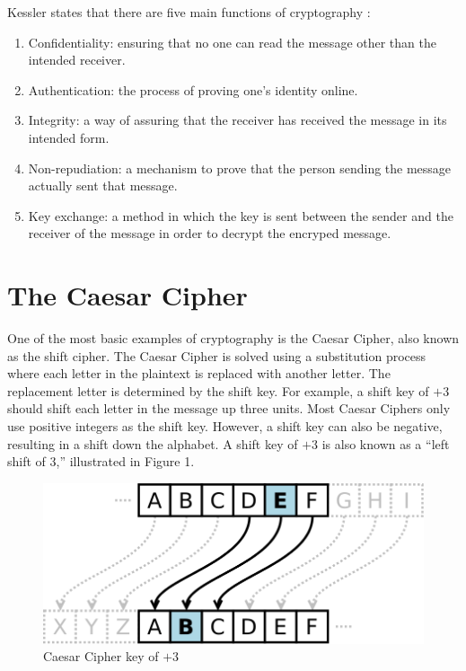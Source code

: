 \documentclass{article}
\begin{document}
Kessler states that there are five main functions of cryptography \cite{ref2:2}:
\begin{enumerate}
    \item Confidentiality: ensuring that no one can read the message other than the intended receiver.
    \item Authentication: the process of proving one’s identity online.
    \item Integrity: a way of assuring that the receiver has received the message in its intended form.
    \item Non-repudiation: a mechanism to prove that the person sending the message actually sent that message.
    \item Key exchange: a method in which the key is sent between the sender and the receiver of the message in order to decrypt the encryped message.
\end{enumerate}

\section{The Caesar Cipher}
One of the most basic examples of cryptography is the Caesar Cipher, also known as the shift cipher. The Caesar Cipher is solved using a substitution process where each letter in the plaintext is replaced with another letter. The replacement letter is determined by the shift key. For example, a shift key of $+3$ should shift each letter in the message up three units. Most Caesar Ciphers only use positive integers as the shift key. However, a shift key can also be negative, resulting in a shift down the alphabet. A shift key of $+3$ is also known as a ``left shift of 3,” illustrated in Figure 1.\\

\begin{figure}[h]
    \centering
    \includegraphics[scale=0.4]{caesar_cipher}
    \caption{Caesar Cipher key of $+3$}
    \label{fig:enter-label}
\end{figure}
\end{document}
